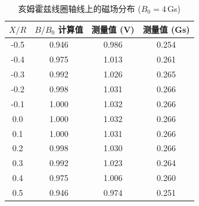 \documentclass[11pt]{ctexart}
\makeatletter
\newcommand{\boxspacing}{\kern\kvtcb@left@rule\kern\kvtcb@boxsep}
\newcommand{\prompt}[4]{
        {\ttfamily\llap{{\color{#2}[#3]:\hspace{3pt}#4}}\vspace{-\baselineskip}}
    }
\makeatother
\begin{document}
            \begin{tcolorbox}[breakable, size=fbox, boxrule=.5pt, pad at break*=1mm, opacityfill=0]
\prompt{Out}{outcolor}{66}{\boxspacing}
\begin{table}[H]
\centering
\caption{亥姆霍兹线圈轴线上的磁场分布 ($B_0=4$\,Gs)}
\label{tab:axial}
\begin{tabular}{c c c c}
\toprule
$X/R$ & $B/B_0$ 计算值 & 测量值 (V) & 测量值 (Gs) \\
\midrule
-0.5 & 0.946 & 0.986 & 0.254 \\
-0.4 & 0.975 & 1.013 & 0.261 \\
-0.3 & 0.992 & 1.026 & 0.265 \\
-0.2 & 0.998 & 1.031 & 0.266 \\
-0.1 & 1.000 & 1.032 & 0.266 \\
 0.0 & 1.000 & 1.032 & 0.266 \\
 0.1 & 1.000 & 1.031 & 0.266 \\
 0.2 & 0.998 & 1.030 & 0.266 \\
 0.3 & 0.992 & 1.023 & 0.264 \\
 0.4 & 0.975 & 1.006 & 0.260 \\
 0.5 & 0.946 & 0.974 & 0.251 \\
\bottomrule
\end{tabular}
\end{table}
\end{tcolorbox}
\end{document}
